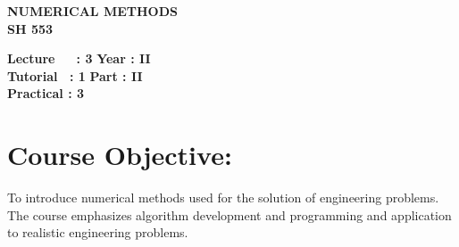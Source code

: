 \begin{center}
    \textbf{\huge{\uppercase{Numerical Methods}}}
    \\
    \vspace{.5cm}
    \textbf{\large{SH 553}}
\end{center}

\noindent\textbf{Lecture\ \ \ : 3} \hfill \textbf{Year : II } \\
\textbf{Tutorial \ : 1} \hfill \textbf{Part : II } \\
\textbf{Practical : 3}  \\

\par
\noindent 
\section*{Course Objective:}
To introduce numerical methods used for the solution of engineering problems. The course emphasizes algorithm development and programming and application to realistic engineering problems.

